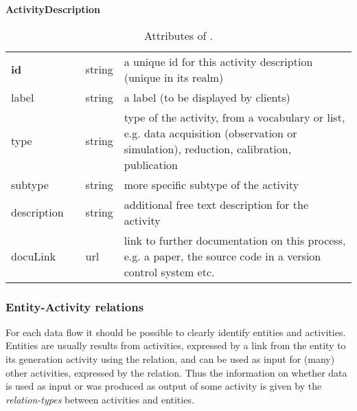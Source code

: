 \begin{table}[ht]
\small
{}\textwidth
\textbf{\normalsize ActivityDescription}\vspace{0.25em}\\
\begin{tabulary}{1.0\textwidth}{@{}p{0cm}p{2.5cm}lL@{}}
\toprule
{} & \head{} &  & \\
\midrule
\textbf{id}  & & string & a unique id for this activity description (unique in its realm)\\
label        & & string & a label (to be displayed by clients)\\
type         & & string & type of the activity, from a vocabulary or list, e.g. data acquisition (observation or simulation), reduction, calibration, publication\\
subtype      & & string & more specific subtype of the activity\\
description  & & string & additional free text description for the activity\\
docuLink     & & url    & link to further documentation on this process, e.g. a 
paper, the source code in a version control system etc.\\
\bottomrule
\end{tabulary}
\caption{Attributes of .}
\end{table}



\subsubsection{Entity-Activity relations}\label{sec:entity-activity-relations}

For each data flow it should be possible to clearly identify entities and 
activities. 
Entities are usually results from activities, expressed by a link from 
the entity to its generation activity using the  relation,
and can be used as input for (many) other activities, expressed by the  relation.
Thus the information on whether data is used as input or was produced as output of 
some activity is given by the \emph{relation-types} between activities and entities.

